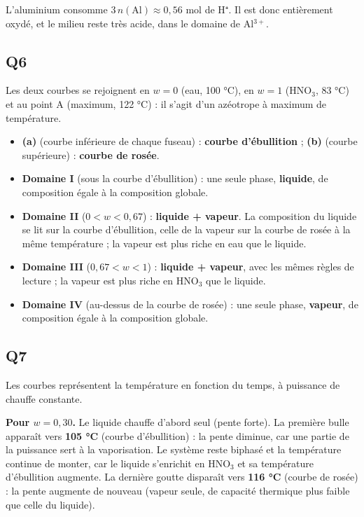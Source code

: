 \documentclass[11pt,a4paper]{article}
\providecommand{\tightlist}{\setlength{\itemsep}{0pt}\setlength{\parskip}{0pt}}
\begin{document}
L'aluminium consomme \(3\,n(\mathrm{Al})\approx0{,}56\) mol de H⁺. Il est donc entièrement oxydé, et le milieu reste très acide, dans le domaine de Al\(^{3+}\).

\hypertarget{q6}{%
\subsection{Q6}\label{q6}}

Les deux courbes se rejoignent en \(w=0\) (eau, 100 °C), en \(w=1\) (HNO\(_3\), 83 °C) et au point A (maximum, 122 °C) : il s'agit d'un azéotrope à maximum de température.

\begin{itemize}
\tightlist
\item
  \textbf{(a)} (courbe inférieure de chaque fuseau) : \textbf{courbe d'ébullition} ; \textbf{(b)} (courbe supérieure) : \textbf{courbe de rosée}.
\item
  \textbf{Domaine I} (sous la courbe d'ébullition) : une seule phase, \textbf{liquide}, de composition égale à la composition globale.
\item
  \textbf{Domaine II} (\(0<w<0{,}67\)) : \textbf{liquide + vapeur}. La composition du liquide se lit sur la courbe d'ébullition, celle de la vapeur sur la courbe de rosée à la même température ; la vapeur est plus riche en eau que le liquide.
\item
  \textbf{Domaine III} (\(0{,}67<w<1\)) : \textbf{liquide + vapeur}, avec les mêmes règles de lecture ; la vapeur est plus riche en HNO\(_3\) que le liquide.
\item
  \textbf{Domaine IV} (au-dessus de la courbe de rosée) : une seule phase, \textbf{vapeur}, de composition égale à la composition globale.
\end{itemize}

\hypertarget{q7}{%
\subsection{Q7}\label{q7}}

Les courbes représentent la température en fonction du temps, à puissance de chauffe constante.

\textbf{Pour \(w=0{,}30\).} Le liquide chauffe d'abord seul (pente forte). La première bulle apparaît vers \textbf{105 °C} (courbe d'ébullition) : la pente diminue, car une partie de la puissance sert à la vaporisation. Le système reste biphasé et la température continue de monter, car le liquide s'enrichit en HNO\(_3\) et sa température d'ébullition augmente. La dernière goutte disparaît vers \textbf{116 °C} (courbe de rosée) : la pente augmente de nouveau (vapeur seule, de capacité thermique plus faible que celle du liquide).
\end{document}
